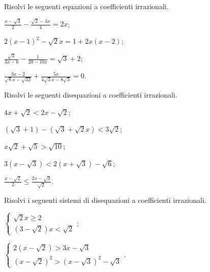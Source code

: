 \begin{esercizio}[\Ast]
 \label{ese:2.102}
Risolvi le seguenti equazioni a coefficienti irrazionali.
 \begin{multicols}{2}
 \begin{enumeratea}
 \item $\frac{x-\sqrt 3} 2-\frac{\sqrt 2-3x} 4=2x$;
 \item $2(x-1)^2-\sqrt 2x=1+2x(x-2)$;
 \item $\frac{\sqrt 3}{3x-6}-\frac 1{20-10x}=\sqrt 3+2$;
 \item $\frac{3x-2}{\sqrt 8x-\sqrt{32}}+\frac{5x}{4\sqrt 3x-8\sqrt 3}=0$.
 \end{enumeratea}
 \end{multicols}
\end{esercizio}

\begin{esercizio}[\Ast]
 \label{ese:2.103}
Risolvi le seguenti disequazioni a coefficienti irrazionali.
 \begin{multicols}{2}
 \begin{enumeratea}
 \item $4x+\sqrt 2<2x-\sqrt 2$;
 \item $(\sqrt 3+1)-(\sqrt 3+\sqrt 2x)<3\sqrt 2$;
 \item $x\sqrt 2+\sqrt 5>\sqrt{10}$;
 \item $3(x-\sqrt 3)<2(x+\sqrt 3)-\sqrt 6$;
 \item $\frac{x-\sqrt 2} 2\le \frac{2x-\sqrt 3}{\sqrt 2}$.
 \end{enumeratea}
 \end{multicols}
\end{esercizio}

\begin{esercizio}[\Ast]
 \label{ese:2.104}
Risolvi i seguenti sistemi di disequazioni a coefficienti irrazionali.
 \begin{multicols}{2}
 \begin{enumeratea}
 \item $\left\{\begin{array}{l}\sqrt 2x\ge 2\\
 (3-\sqrt 2)x<\sqrt 2 \end{array}\right.;$
 \item $\left\{\begin{array}{l}2(x-\sqrt 2)>3x-\sqrt 3\\
 (x-\sqrt 2)^2>(x-\sqrt 3)^2-\sqrt 3 \end{array}\right..$
 \end{enumeratea}
 \end{multicols}
\end{esercizio}

